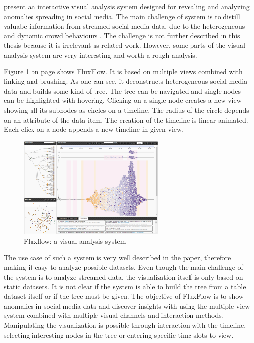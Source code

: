 \citeauthor{Zhao2014} present an interactive visual analysis system designed for revealing and analyzing anomalies spreading in social media. The main challenge of system is to distill valuabe information from streamed social media data, due to the heterogeneous and dynamic crowd behaviours . The challenge is not further described in this thesis because it is irrelevant as related work. However, some parts of the visual analysis system are very interesting and worth a rough analysis.

Figure \ref{fig:fluxflow} on page \pageref{fig:fluxflow} shows FluxFlow. It is based on multiple views combined with linking and brushing. As one can see, it deconstructs heterogeneous social media data and builds some kind of tree. The tree can be navigated and single nodes can be highlighted with hovering. Clicking on a single node creates a new view showing all its subnodes as circles on a timeline. The radius of the circle depends on an attribute of the data item. The creation of the timeline is linear animated. Each click on a node appends a new timeline in given view.

\begin{figure}[!htb]
\centering
\includegraphics[height=5cm]{images/methods/related/fluxflow.png}
\caption[
    Fluxflow: a visual analysis system .
]{Fluxflow: a visual analysis system}
\label{fig:fluxflow}
\end{figure}

The use case of such a system is very well described in the paper, therefore making it easy to analyze possible datasets. Even though the main challenge of the system is to analyze streamed data, the visualization itself is only based on static datasets. It is not clear if the system is able to build the tree from a table dataset itself or if the tree must be given.
The objective of FluxFlow is to show anomalies in social media data and discover insights with using the multiple view system combined with multiple visual channels and interaction methods. Manipulating the visualization is possible through interaction with the timeline, selecting interesting nodes in the tree or entering specific time slots to view.